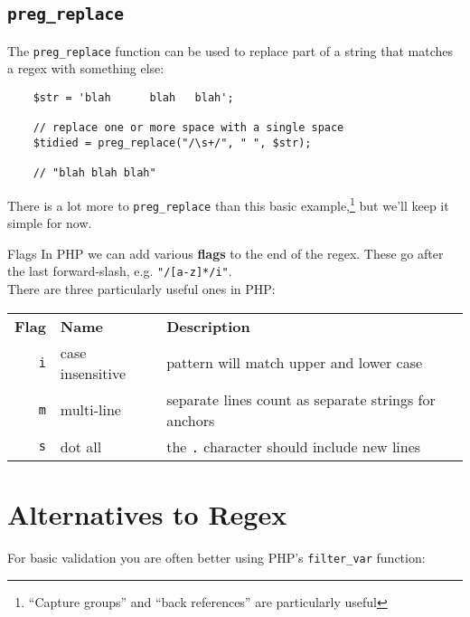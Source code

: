 \subsection{\texttt{preg\_replace}}

The \texttt{preg\_replace} function can be used to replace part of a string that matches a regex with something else:

\begin{verbatim}
    $str = 'blah      blah   blah';

    // replace one or more space with a single space
    $tidied = preg_replace("/\s+/", " ", $str);

    // "blah blah blah"
\end{verbatim}


There is a lot more to \texttt{preg\_replace} than this basic example,\footnote{``Capture groups'' and ``back references'' are particularly useful} but we'll keep it simple for now.

\pagebreak

\begin{infobox}{Flags}
    In PHP we can add various \textbf{flags} to the end of the regex. These go after the last forward-slash, e.g. \texttt{"/[a-z]*/i"}.
    \\

    There are three particularly useful ones in PHP:
    \\

    \begin{tabularx}{\textwidth}{r l X}
        \textbf{Flag}    & \textbf{Name}    & \textbf{Description} \\
        \texttt{i}       & case insensitive & pattern will match upper and lower case \\
        \texttt{m}       & multi-line       & separate lines count as separate strings for anchors\\
        \texttt{s}       & dot all          & the \texttt{.} character should include new lines\\
    \end{tabularx}
\end{infobox}


\section{Alternatives to Regex}

For basic validation you are often better using PHP's \texttt{filter\_var} function:

